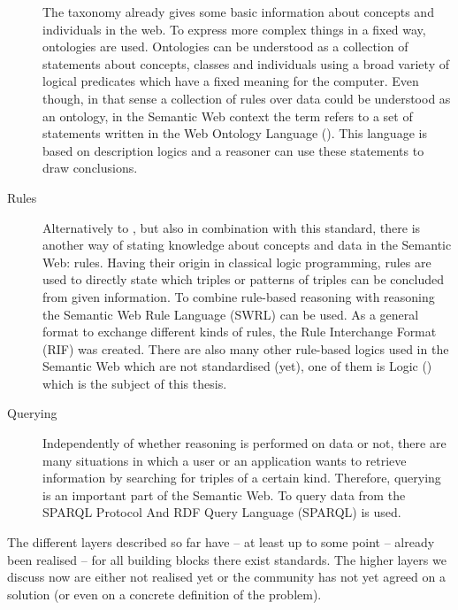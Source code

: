 \begin{description}
 The taxonomy already gives some basic information about concepts and individuals in the web. To express more complex things in a fixed way, ontologies are used. 
 Ontologies can be understood as a collection of statements about concepts, classes and individuals using a broad variety of logical predicates which have a fixed meaning for the computer.
 Even though, in that sense a collection of rules over \rdf data could be understood as an ontology,  in the Semantic Web context the term refers to a set of statements written in the Web 
 Ontology Language (\owl). This language is based on description logics and a reasoner can use these statements to draw conclusions.
 \item[Rules] Alternatively to \owl, but also in combination with this standard, there is another way of stating knowledge about concepts and data in the Semantic Web: rules. 
 Having their origin in classical logic programming, rules are used to directly state which triples or patterns of triples can be concluded from given information. To combine rule-based reasoning 
 with \owl reasoning the Semantic Web Rule Language (SWRL) can be used. As a general format to exchange different kinds of rules, the Rule Interchange Format (RIF) was created. 
 There are also many other 
 rule-based logics used in the Semantic Web which are not standardised (yet), one of them is \notationthree Logic (\nthreelogic) 
 which is the subject of this thesis.
 \item[Querying] Independently of whether reasoning is performed on \rdf data or not, there are many situations in which a user or an application wants to retrieve information 
 by searching for triples of a certain kind. Therefore, querying is an important part of the Semantic Web. To query data from \rdf the SPARQL Protocol And RDF Query Language (SPARQL) is used.
 \end{description}
 The different layers described so far have -- at least up to some point -- already been realised -- for all building blocks there exist standards. 
 The higher layers we discuss now
are either not realised yet or the community has not yet agreed on a solution (or even on a concrete definition of the problem). 
